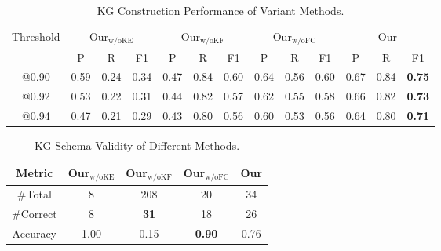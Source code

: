 \begin{table*}[t]
\centering
\caption{KG Construction Performance of Variant Methods.}
\label{tab: res32}
\begin{tabular}{c|ccc|ccc|ccc|ccc}
\hline
\multirow{2}{*}{Threshold} & \multicolumn{3}{c|}{Our$_{\text{w/oKE}}$}                    & \multicolumn{3}{c|}{Our$_{\text{w/oKF}}$}                    & \multicolumn{3}{c|}{Our$_{\text{w/oFC}}$}                    & \multicolumn{3}{c}{Our}                                      \\ \cline{2-13} 
                           & \multicolumn{1}{c|}{P}    & \multicolumn{1}{c|}{R}    & F1   & \multicolumn{1}{c|}{P}    & \multicolumn{1}{c|}{R}    & F1   & \multicolumn{1}{c|}{P}    & \multicolumn{1}{c|}{R}    & F1   & \multicolumn{1}{c|}{P}    & \multicolumn{1}{c|}{R}    & F1   \\ \hline
@0.90                      & \multicolumn{1}{c|}{0.59} & \multicolumn{1}{c|}{0.24} & 0.34 & \multicolumn{1}{c|}{0.47} & \multicolumn{1}{c|}{0.84} & 0.60 & \multicolumn{1}{c|}{0.64} & \multicolumn{1}{c|}{0.56} & 0.60 & \multicolumn{1}{c|}{0.67} & \multicolumn{1}{c|}{0.84} & \textbf{0.75} \\ \hline
@0.92                      & \multicolumn{1}{c|}{0.53} & \multicolumn{1}{c|}{0.22} & 0.31 & \multicolumn{1}{c|}{0.44} & \multicolumn{1}{c|}{0.82} & 0.57 & \multicolumn{1}{c|}{0.62} & \multicolumn{1}{c|}{0.55} & 0.58 & \multicolumn{1}{c|}{0.66} & \multicolumn{1}{c|}{0.82} & \textbf{0.73} \\ \hline
@0.94                      & \multicolumn{1}{c|}{0.47} & \multicolumn{1}{c|}{0.21} & 0.29 & \multicolumn{1}{c|}{0.43} & \multicolumn{1}{c|}{0.80} & 0.56 & \multicolumn{1}{c|}{0.60} & \multicolumn{1}{c|}{0.53} & 0.56 & \multicolumn{1}{c|}{0.64} & \multicolumn{1}{c|}{0.80} &\textbf{0.71} \\ \hline
\end{tabular}
\end{table*}

\begin{table}[t]
\centering
\caption{KG Schema Validity of Different Methods.}
\label{tab: res31}
\begin{tabular}{c|c|c|c|c}
\hline
Metric     &  Our$_{\text{w/oKE}}$  & Our$_{\text{w/oKF}}$   & Our$_{\text{w/oFC}}$     & Our \\ \hline
\#Total    &  8                     & 208                    & 20                     & 34   \\ \hline
\#Correct  &  8                     & \textbf{31}                     & 18                     & 26    \\ \hline
Accuracy   &  1.00                  & 0.15                     & \textbf{0.90}                   & 0.76   \\ \hline
\end{tabular}
\vspace{-2mm}
\end{table}

